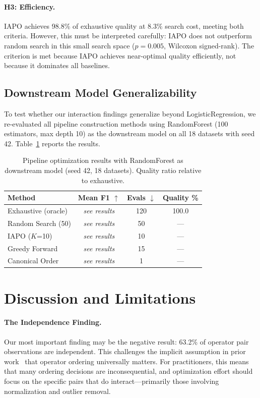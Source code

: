 \documentclass[preprint]{article}
\begin{document}
\paragraph{H3: Efficiency.} IAPO achieves 98.8\% of exhaustive quality at 8.3\% search cost, meeting both criteria. However, this must be interpreted carefully: IAPO does not outperform random search in this small search space ($p = 0.005$, Wilcoxon signed-rank). The criterion is met because IAPO achieves near-optimal quality efficiently, not because it dominates all baselines.

\subsection{Downstream Model Generalizability}

To test whether our interaction findings generalize beyond LogisticRegression, we re-evaluated all pipeline construction methods using RandomForest (100 estimators, max depth 10) as the downstream model on all 18 datasets with seed 42. Table~\ref{tab:rf_results} reports the results.

\begin{table}[t]
\caption{Pipeline optimization results with RandomForest as downstream model (seed 42, 18 datasets). Quality ratio relative to exhaustive.}
\label{tab:rf_results}
\centering
\begin{tabular}{lccc}
\toprule
Method & Mean F1 $\uparrow$ & Evals $\downarrow$ & Quality \% \\
\midrule
Exhaustive (oracle) & {\em see results} & 120 & 100.0 \\
Random Search (50)  & {\em see results} & 50  & --- \\
IAPO ($K$=10)       & {\em see results} & 10  & --- \\
Greedy Forward      & {\em see results} & 15  & --- \\
Canonical Order     & {\em see results} & 1   & --- \\
\bottomrule
\end{tabular}
\end{table}

\section{Discussion and Limitations}
\label{sec:discussion}

\paragraph{The Independence Finding.} Our most important finding may be the negative result: 63.2\% of operator pair observations are independent. This challenges the implicit assumption in prior work~\citep{Krishnan2019AlphaClean, BertiEquille2019Learn2Clean} that operator ordering universally matters. For practitioners, this means that many ordering decisions are inconsequential, and optimization effort should focus on the specific pairs that do interact---primarily those involving normalization and outlier removal.
\end{document}
